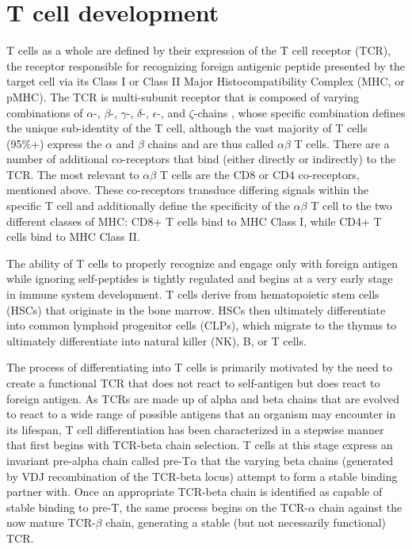 \section{T cell development}
T cells as a whole are defined by their expression of the T cell receptor (TCR), the receptor responsible for recognizing foreign antigenic peptide presented by the target cell via its Class I or Class II Major Histocompatibility Complex (MHC, or pMHC). The TCR is multi-subunit receptor that is composed of varying combinations of $\alpha$-, $\beta$-, $\gamma$-, $\delta$-, $\epsilon$-, and $\zeta$-chains \cite{Germain2002}, whose specific combination defines the unique sub-identity of the T cell, although the vast majority of T cells (95\%+) express the $\alpha$ and $\beta$ chains and are thus called $\alpha \beta$ T cells. There are a number of additional co-receptors that bind (either directly or indirectly) to the TCR. The most relevant to $\alpha \beta$ T cells are the CD8 or CD4 co-receptors, mentioned above. These co-receptors transduce differing signals within the specific T cell and additionally define the specificity of the $\alpha \beta$ T cell to the two different classes of MHC: CD8+ T cells bind to MHC Class I, while CD4+ T cells bind to MHC Class II. 

The ability of T cells to properly recognize and engage only with foreign antigen while ignoring self-peptides is tightly regulated and begins at a very early stage in immune system development. T cells derive from hematopoietic stem cells (HSCs) that originate in the bone marrow. HSCs then ultimately differentiate into common lymphoid progenitor cells (CLPs), which migrate to the thymus to ultimately differentiate into natural killer (NK), B, or T cells. 

The process of differentiating into T cells is primarily motivated by the need to create a functional TCR that does not react to self-antigen but does react to foreign antigen. As TCRs are made up of alpha and beta chains that are evolved to react to a wide range of possible antigens that an organism may encounter in its lifespan, T cell differentiation has been characterized in a stepwise manner that first begins with TCR-beta chain selection. T cells at this stage express an invariant pre-alpha chain called pre-T$\alpha$ that the varying beta chains (generated by VDJ recombination of the TCR-beta locus) attempt to form a stable binding partner with. Once an appropriate TCR-beta chain is identified as capable of stable binding to pre-T, the same process begins on the TCR-$\alpha$ chain against the now mature TCR-$\beta$ chain, generating a stable (but not necessarily functional) TCR.

